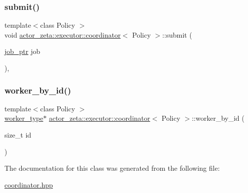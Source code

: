 \mbox{\label{classactor__zeta_1_1executor_1_1coordinator_a522583023fb9e0c774ca101a09b938f1}} 
\subsubsection{\texorpdfstring{submit()}{submit()}}
{\footnotesize\ttfamily template$<$class Policy $>$ \\
void \hyperlink{classactor__zeta_1_1executor_1_1coordinator}{actor\+\_\+zeta\+::executor\+::coordinator}$<$ Policy $>$\+::submit (\begin{DoxyParamCaption}\item[{\hyperlink{classactor__zeta_1_1executor_1_1coordinator_a6104368cc7f2de545e7c242eda00fcf7}{job\+\_\+ptr}}]{job }\end{DoxyParamCaption})\hspace{0.3cm}{\ttfamily [inline]}, {\ttfamily [override]}}

\mbox{\label{classactor__zeta_1_1executor_1_1coordinator_aa008bba1c4e8d94467e79465f978e95b}} 
\subsubsection{\texorpdfstring{worker\+\_\+by\+\_\+id()}{worker\_by\_id()}}
{\footnotesize\ttfamily template$<$class Policy $>$ \\
\hyperlink{classactor__zeta_1_1executor_1_1coordinator_a97ba3b1f4578cf25c7311e177edf8c59}{worker\+\_\+type}$\ast$ \hyperlink{classactor__zeta_1_1executor_1_1coordinator}{actor\+\_\+zeta\+::executor\+::coordinator}$<$ Policy $>$\+::worker\+\_\+by\+\_\+id (\begin{DoxyParamCaption}\item[{size\+\_\+t}]{id }\end{DoxyParamCaption})\hspace{0.3cm}{\ttfamily [inline]}}



The documentation for this class was generated from the following file\+:\begin{DoxyCompactItemize}
\item 
\hyperlink{coordinator_8hpp}{coordinator.\+hpp}\end{DoxyCompactItemize}

